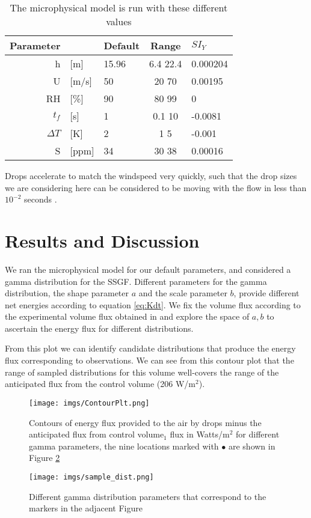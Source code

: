 \documentclass[10pt,a4paper]{article}
\begin{document}
\begin{table}[h]
\centering
\begin{tabular}{r l l c l }
Parameter& & Default & Range & $SI_Y$\\
\hline
h &[m] & 15.96 & 6.4 22.4 & 0.000204  \\
U &[m/s] & 50 & 20 70 & 0.00195  \\
RH &[\%] & 90 & 80 99 & 0  \\
$t_f$ &[s] & 1 & 0.1 10 & -0.0081  \\
$\Delta T$ &[K] & 2 & 1 5 & -0.001  \\
S &[ppm] & 34 & 30 38 & 0.00016 \\
\end{tabular}
\caption{The microphysical model is run with these different values}
\end{table}


 

Drops accelerate to match the windspeed very quickly, such that the drop sizes we are considering here can be considered to be moving with the flow in less than $10^{-2}$ seconds \citep{Andreas2004}.


\section{Results and Discussion}
We ran the microphysical model for our default parameters, and considered a gamma distribution for the SSGF.
Different parameters for the gamma distribution, the shape parameter $a$ and the scale parameter $b$, provide different net energies according to equation \ref{eq:Kdt}. We fix the volume flux according to the experimental volume flux obtained in \citet{Ortiz-Suslow2016} and explore the space of $a,b$ to ascertain the energy flux for different distributions. \par 
From this plot we can identify candidate distributions that produce the energy flux corresponding to observations. We can see from this contour plot that the range of sampled distributions for this volume well-covers the range of the anticipated flux from the control volume (206 W/m$^2$).
\begin{figure}[h!]
\centering
\texttt{[image: imgs/ContourPlt.png]}
\caption{Contours of energy flux provided to the air by drops minus the anticipated flux from control volume$_1$ flux in Watts/m$^2$ for different gamma parameters, the nine locations marked with $\bullet$ are shown in Figure \ref{Fig:ExSlopes}\label{Fig:EContour}}
\end{figure}
\begin{figure}[h!]
\texttt{[image: imgs/sample\_dist.png]}
\caption{Different gamma distribution parameters that correspond to the markers in the adjacent Figure\label{Fig:ExSlopes}}
\end{figure}\\
\end{document}
